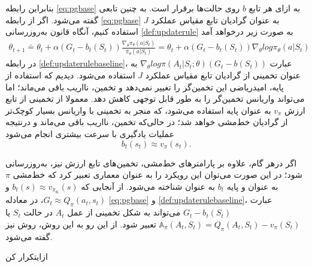 بنابراین رابطه 
\ref{eq:pgbase}
به ازای هر تابع $b$ روی حالت‌ها برقرار است. به چنین تابعی 
\textit{}
 گفته می‌شود. اگر از رابطه
  \ref{eq:pgbase}
  به عنوان گرادیان تابع مقیاس عملکرد $J$ استفاده کنیم، آنگاه قانون به‌روزرسانی 
  \ref{def:updaterule}
  به صورت زیر درخواهد آمد
\begin{align}
\theta_{t+1} \doteq \theta_t + \alpha (G_t - b_t(S_t)) \frac{\nabla_\theta \pi_\theta (a|S_t)}{\pi_\theta (a|S_t)} = \theta_t + \alpha (G_t- b_t(S_t)) \nabla_\theta log \pi_\theta (a|S_t)
\label{def:updaterulebaseline}
\end{align}
در رابطه 
\ref{def:updaterulebaseline}،
عبارت 
$\nabla_\theta  log  \pi(A_t|S_t;\theta) (G_t - b(S_t))$
به عنوان تخمینی از گرادیان تابع مقیاس عملکرد $J$ استفاده می‌شود. دیدیم که استفاده از پایه، امیدریاضی این تخمین‌گر را  تغییر نمی‌دهد و تخمین، نااریب باقی می‌ماند؛ اما می‌تواند واریانس تخمین‌گر را به طور قابل توجهی کاهش دهد. معمولا از تخمینی از تابع ارزش $v_\pi$ به عنوان پایه استفاده می‌شود،
که منجر به تخمینی با واریانس بسیار کوچک‌تر از گرادیان خط‌مشی خواهد شد؛ در حالی‌که تخمین، نااریب باقی می‌ماند و درنتیجه عملیات یادگیری با سرعت بیشتری انجام می‌شود
$$b_t(s_t) \approx v_\pi (s_t).$$

اگر درهر گام، علاوه بر پارامترهای خط‌مشی، تخمین‌های تابع ارزش نیز، به‌روزرسانی شود؛  در این صورت می‌توان این رویکرد را به عنوان معماری 
\textit{}
 تعبیر کرد که خط‌مشی $\pi$  به عنوان  و پایه $b_t$ به عنوان   شناخته می‌شود.
از آنجایی که
$b_t(s) \approx v_{\pi_{\theta_t}}(s)$
و
$G_t \approx Q_\pi (a_t, s_t)$،
در معادله 
\ref{eq:pgbase} و
\ref{def:updaterulebaseline}،
عبارت
$G_t - b_t(S_t)$
می‌تواند به شکل تخمینی از
\textit{}
 عمل $A_t$ در حالت $S_t$ یا 
$\mathbb{A}_\pi(A_t,S_t)=Q_\pi(A_t,S_t)-v_\pi(S_t)$
 تعبیر شود. از این رو به این روش، روش 
\textit{
}
نیز گفته می‌شود.

‌ازای{تکرار کن}

